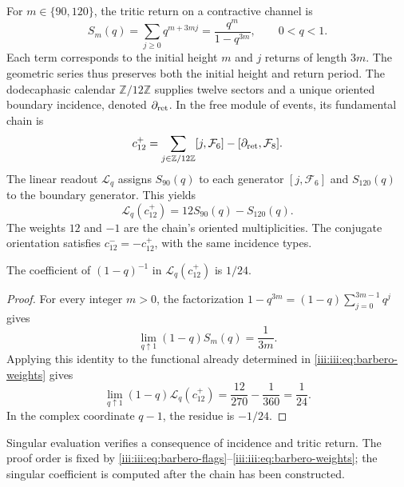 For $m\in\{90,120\}$, the tritic return on a contractive channel is
\begin{equation}
 S_m(q)=\sum_{j\geq0}q^{m+3mj}
       =\frac{q^m}{1-q^{3m}},\qquad 0<q<1.
 \label{iii:iii:eq:barbero-return-series}
\end{equation}
Each term corresponds to the initial height $m$ and $j$ returns of
length $3m$. The geometric series thus preserves both the initial
height and return period. The dodecaphasic calendar
$\mathbb Z/12\mathbb Z$ supplies twelve sectors and a unique oriented
boundary incidence, denoted $\partial_{\rm ret}$. In the free
module of events, its fundamental chain is
\begin{equation}
 c_{12}^{+}
 =\sum_{j\in\mathbb Z/12\mathbb Z}[j,\mathcal F_6]
  -[\partial_{\rm ret},\mathcal F_8].
 \label{iii:iii:eq:barbero-cycle}
\end{equation}
The linear readout $\mathscr L_q$ assigns $S_{90}(q)$ to each generator
$[j,\mathcal F_6]$ and $S_{120}(q)$ to the boundary generator. This yields
\begin{equation}
 \mathscr L_q(c_{12}^{+})=12S_{90}(q)-S_{120}(q).
 \label{iii:iii:eq:barbero-weights}
\end{equation}
The weights $12$ and $-1$ are the chain's oriented multiplicities.
The conjugate orientation satisfies $c_{12}^{-}=-c_{12}^{+}$, with the
same incidence types.

\begin{proposition}
\label{iii:iii:prop:barbero-pole}
The coefficient of $(1-q)^{-1}$ in
$\mathscr L_q(c_{12}^{+})$ is $1/24$.
\end{proposition}
\begin{proof}
For every integer $m>0$, the factorization
$1-q^{3m}=(1-q)\sum_{j=0}^{3m-1}q^j$ gives
\[
 \lim_{q\uparrow1}(1-q)S_m(q)=\frac1{3m}.
\]
Applying this identity to the functional already determined in
\eqref{iii:iii:eq:barbero-weights} gives
\begin{equation}
 \lim_{q\uparrow1}(1-q)\mathscr L_q(c_{12}^{+})
 =\frac{12}{270}-\frac1{360}=\frac1{24}.
 \label{iii:iii:eq:barbero-pole}
\end{equation}
In the complex coordinate $q-1$, the residue is $-1/24$.
\end{proof}

Singular evaluation verifies a consequence of incidence and tritic
return. The proof order is fixed by
\eqref{iii:iii:eq:barbero-flags}--\eqref{iii:iii:eq:barbero-weights}; the
singular coefficient is computed after the chain has been constructed.

